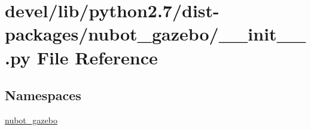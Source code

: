 \hypertarget{devel_2lib_2python2_87_2dist-packages_2nubot__gazebo_2____init_____8py}{\section{devel/lib/python2.7/dist-\/packages/nubot\-\_\-gazebo/\-\_\-\-\_\-init\-\_\-\-\_\-.py File Reference}
\label{devel_2lib_2python2_87_2dist-packages_2nubot__gazebo_2____init_____8py}
}
\subsection*{Namespaces}
\begin{DoxyCompactItemize}
\item 
\hyperlink{namespacenubot__gazebo}{nubot\-\_\-gazebo}
\end{DoxyCompactItemize}
